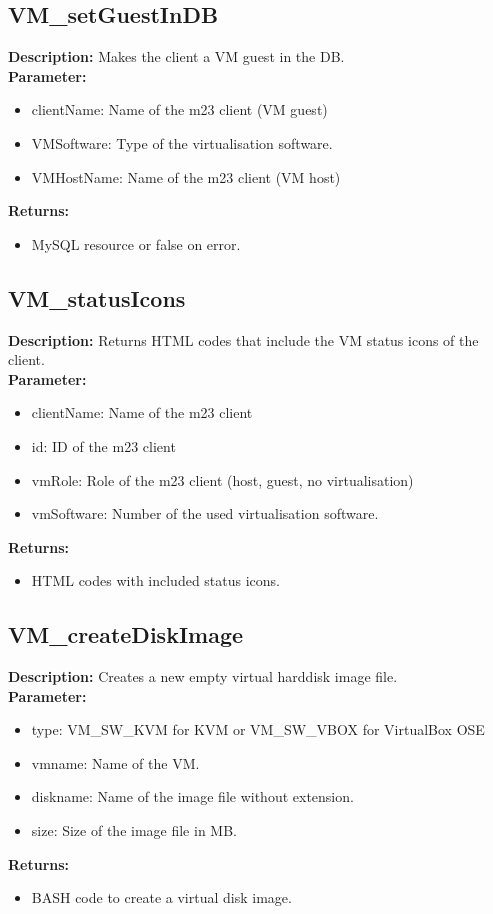 \subsection{VM\_setGuestInDB}
\textbf{Description:} Makes the client a VM guest in the DB.\\
\textbf{Parameter:}
\begin{itemize}
\item clientName: Name of the m23 client (VM guest)
\item VMSoftware: Type of the virtualisation software.
\item VMHostName: Name of the m23 client (VM host)
\end{itemize}
\textbf{Returns:}
\begin{itemize}
\item MySQL resource or false on error.
\end{itemize}

\subsection{VM\_statusIcons}
\textbf{Description:} Returns HTML codes that include the VM status icons of the client.\\
\textbf{Parameter:}
\begin{itemize}
\item clientName: Name of the m23 client
\item id: ID of the m23 client
\item vmRole: Role of the m23 client (host, guest, no virtualisation)
\item vmSoftware: Number of the used virtualisation software.
\end{itemize}
\textbf{Returns:}
\begin{itemize}
\item HTML codes with included status icons.
\end{itemize}

\subsection{VM\_createDiskImage}
\textbf{Description:} Creates a new empty virtual harddisk image file.\\
\textbf{Parameter:}
\begin{itemize}
\item type: VM\_SW\_KVM for KVM or VM\_SW\_VBOX for VirtualBox OSE
\item vmname: Name of the VM.
\item diskname: Name of the image file without extension.
\item size: Size of the image file in MB.
\end{itemize}
\textbf{Returns:}
\begin{itemize}
\item BASH code to create a virtual disk image.
\end{itemize}

